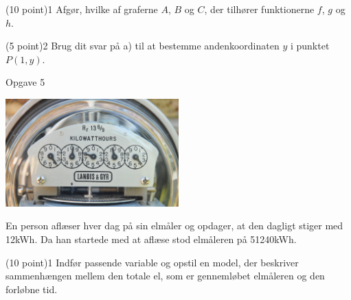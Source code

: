 \begin{delopgave}{(10 point)}{1}
	Afgør, hvilke af graferne $A$, $B$ og $C$, der tilhører funktionerne $f$, $g$ og $h$. 
\end{delopgave}
\begin{delopgave}{(5 point)}{2}
	Brug dit svar på a) til at bestemme andenkoordinaten $y$ i punktet $P(1,y)$.
\end{delopgave}
\newpage
\begin{opgavetekst}{Opgave 5}
	\begin{center}
		\includegraphics[width = 0.5\textwidth]{Billeder/el.jpg}
	\end{center}
	En person aflæser hver dag på sin elmåler og opdager, at den dagligt stiger med 12kWh. Da 
	han startede med at aflæse stod elmåleren på 51240kWh.
\end{opgavetekst}
\begin{delopgave}{(10 point)}{1}
	Indfør passende variable og opstil en model, der beskriver sammenhængen mellem den totale
	el, som er gennemløbet elmåleren og den forløbne tid. 
\end{delopgave}
\newpage
